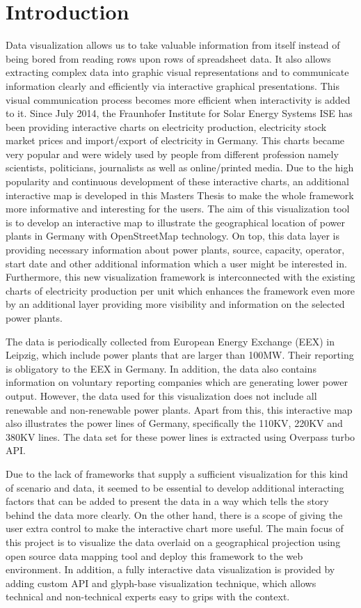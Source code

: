 \chapter{Introduction}

Data visualization allows us to take valuable information from itself instead of being bored from reading rows upon rows of spreadsheet data. It also allows extracting complex data into graphic visual representations and to communicate information clearly and efficiently via interactive graphical presentations. This visual communication process becomes more efficient when interactivity is added to it. Since July 2014, the Fraunhofer Institute for Solar Energy Systems ISE has been providing interactive charts on electricity production, electricity stock market prices and import/export of electricity in Germany. This charts became very popular and were widely used by people from different profession namely scientists, politicians, journalists as well as online/printed media. Due to the high popularity and continuous development of these interactive charts, an additional interactive map is developed in this Masters Thesis to make the whole framework more informative and interesting for the users. The aim of this visualization tool is to develop an interactive map to illustrate the geographical location of power plants in Germany with OpenStreetMap technology. On top, this data layer is providing necessary information about power plants, source, capacity, operator, start date and other additional information which a user might be interested in. Furthermore, this new visualization framework is interconnected with the existing charts of electricity production per unit which enhances the framework even more by an additional layer providing more visibility and information on the selected power plants.

The data is periodically collected from European Energy Exchange (EEX) in Leipzig, which include power plants that are larger than 100MW. Their reporting is obligatory to the EEX in Germany. In addition, the data also contains information on voluntary reporting companies which are generating lower power output. However, the data used for this visualization does not include all renewable and non-renewable power plants. Apart from this, this interactive map also illustrates the power lines of Germany, specifically the 110KV, 220KV and 380KV lines. The data set for these power lines is extracted using Overpass turbo API. 

Due to the lack of frameworks that supply a sufficient visualization for this kind of scenario and data, it seemed to be essential to develop additional interacting factors that can be added to present the data in a way which tells the story behind the data more clearly. On the other hand, there is a scope of giving the user extra control to make the interactive chart more useful. The main focus of this project is to visualize the data overlaid on a geographical projection using open source data mapping tool and deploy this framework to the web environment. In addition, a fully interactive data visualization is provided by adding custom API and glyph-base visualization technique, which allows technical and non-technical experts easy to grips with the context.
 
